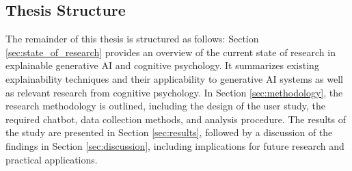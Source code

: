 \subsection{Thesis Structure} \label{subsec:thesis-structure}

The remainder of this thesis is structured as follows: Section \ref{sec:state_of_research} provides an overview of the current state of research in explainable generative \ac{AI} and cognitive psychology. It summarizes existing explainability techniques and their applicability to generative \ac{AI} systems as well as relevant research from cognitive psychology. In Section \ref{sec:methodology}, the research methodology is outlined, including the design of the user study, the required chatbot, data collection methods, and analysis procedure. The results of the study are presented in Section \ref{sec:results}, followed by a discussion of the findings in Section \ref{sec:discussion}, including implications for future research and practical applications.
